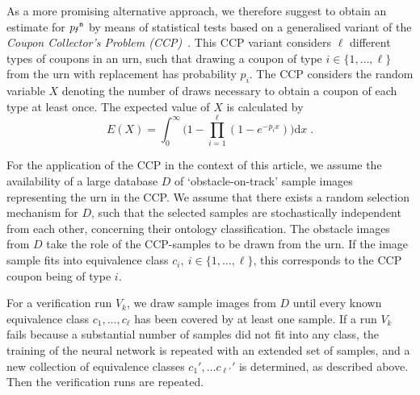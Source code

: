 \documentclass[runningheads,a4paper]{llncs}
\begin{document}
 

As a more promising alternative approach, we therefore suggest to obtain   an    estimate for ${p_\text{\Lightning}}^\mathsf{n}$ by means of statistical tests based on a generalised variant of the  \emph{Coupon Collector's Problem (CCP)}~\cite{FLAJOLET1992207}. This CCP variant considers $\ell$ different types of coupons in an urn, such that drawing a coupon of type $i \in \{ 1,\dots,\ell\}$ from the urn with replacement has probability $p_i$.   The CCP considers the random variable $X$ denoting the number of draws necessary to obtain a coupon of each type at least once.
The expected value of $X$ is calculated by~\cite{FLAJOLET1992207}
\begin{equation}\label{eq:expected}
E(X) = \int_0^\infty \big( 1 - \prod_{i=1}^\ell (1 - e^{-p_i x})  \big)\mathrm{d}x\;.
\end{equation}

For the application of the CCP in the context of this article, we assume  the availability of a large database $D$ of `obstacle-on-track' sample images representing the urn in the CCP. We assume that there exists a random selection mechanism for $D$, such that the selected samples are stochastically independent from each other, concerning their ontology classification. The obstacle images from $D$ take the role of the CCP-samples to be drawn from the urn. If the image sample fits into equivalence class $c_i, \ i\in \{1,\dots,\ell\}$, this corresponds to the CCP coupon being of type $i$.

For a verification run $V_k$, we draw sample images from $D$ until every known equivalence class $c_1,\dots,c_\ell$ has been covered by at least one sample. If a run $V_k$ fails because a substantial number of samples did not fit into any class, the training of the neural network is repeated with an extended set of samples, and a new collection of equivalence classes $c_1',\dots c_{\ell'}'$ is determined, as described  above. Then the verification runs are repeated.  
\end{document}
